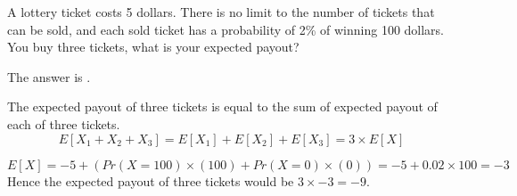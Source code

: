 \documentclass{ximera}
\begin{document}
\begin{question}
A lottery ticket costs 5 dollars.  There is no limit to the number of
tickets that can be sold, and each sold ticket has a probability of
2\% of winning 100 dollars.  You buy three tickets, what is your expected
payout?

\begin{solution}
The answer is .
\end{solution}

The expected payout of three tickets is equal to the sum of expected
payout of each of three tickets.
\[
E[X_1 + X_2 + X_3] = E[X_1] + E[X_2] + E[X_3] = 3 \times E[X]
\]

\[
E[X] = -5 + \left(Pr(X = 100) \times (100) + Pr(X = 0) \times (0)\right) = -5 + 0.02 \times 100 = -3
\]
Hence the expected payout of three tickets would be $3 \times -3 = -9$.
\end{question}
\end{document}
